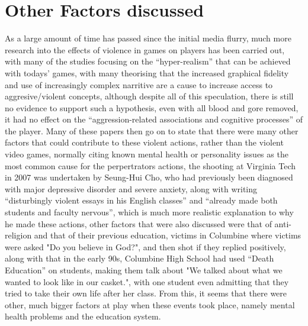 \documentclass{scrartcl}
\begin{document}
\section{Other Factors discussed}
As a large amount of time has passed since the initial media flurry, much more research into the effects of violence in games on players has been carried out, with many of the studies focusing on the ``hyper-realism'' that can be achieved with todays' games, with many theorising that the increased graphical fidelity and use of increasingly complex narritive are a cause to increase access to aggresive/violent concepts\cite{zendle2015higher}, although despite all of this speculation, there is still no evidence to support such a hypothesis, even with all blood and gore removed, it had no effect on the ``aggression-related associations and cognitive processes'' of the player\cite{ashbarry2016blood}. Many of these papers then go on to state that there were many other factors that could contribute to these violent actions, rather than the violent video games, normally citing known mental health or personality issues as the most common cause for the perpertrators actions, the shooting at Virginia Tech in 2007 was undertaken by Seung-Hui Cho, who had previously been diagnosed with major depressive disorder and severe anxiety\cite{seung}, along with writing ``disturbingly violent essays in his English classes'' and ``already made both students and faculty nervous''\cite{massacrelink}, which is much more realistic explanation to why he made these actions, other factors that were also discussed were that of anti-religion and that of their previous education, victims in Columbine where victims were asked "Do you believe in God?", and then shot if they replied positively\cite{gameskill}, along with that in the early 90s, Columbine High School had used ``Death Education'' on students, making them talk about "We talked about what we wanted to look like in our casket.", with one student even admitting that they tried to take their own life after her class\cite{gameskill}. From this, it seems that there were other, much bigger factors at play when these events took place, namely mental health problems and the education system.\\
\end{document}
